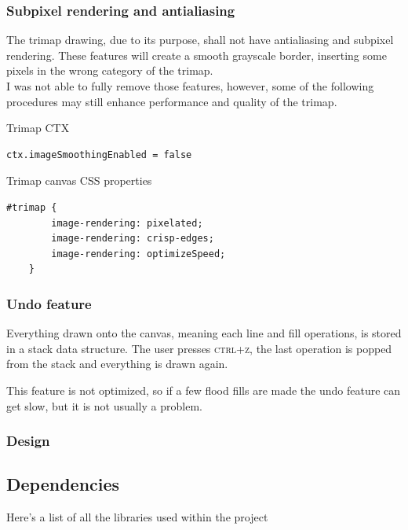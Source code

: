 \documentclass[a4paper]{article}
\begin{document}
\pagebreak

\subsubsection{Subpixel rendering and antialiasing}

The trimap drawing, due to its purpose, shall not have antialiasing
and subpixel rendering. These features will create a smooth grayscale border,
inserting some pixels in the wrong category of the trimap. \\

I was not able to fully remove those features, however, some of the following
procedures may still enhance performance and quality of the trimap.

{\color{gray}Trimap CTX}
\begin{lstlisting}[style=JS, style=boxed]
    ctx.imageSmoothingEnabled = false
\end{lstlisting}

Trimap canvas CSS properties
\begin{lstlisting}[style=JS, style=boxed]
    #trimap {
        image-rendering: pixelated;
        image-rendering: crisp-edges;
        image-rendering: optimizeSpeed;
    }
\end{lstlisting}

\subsubsection{Undo feature}

Everything drawn onto the canvas, meaning each line and fill operations,
is stored in a stack data structure.
The user presses \textsc{ctrl+z}, the last operation
is popped from the stack and everything is drawn again.

This feature is not optimized, so if a few flood fills are
made the undo feature can get slow, but it is not usually a problem.

\pagebreak

\subsubsection{Design}

\pagebreak

\subsection{Dependencies}

Here's a list of all the libraries used within the project
\end{document}
